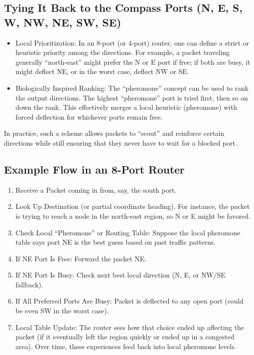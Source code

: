 \documentclass[../OAE-SPEC-MAIN.tex]{subfiles}
\begin{document}
\subsection{Tying It Back to the Compass Ports (N, E, S, W, NW, NE, SW, SE)}
%
\begin{itemize}
\item Local Prioritization: In an 8-port (or 4-port) router, one can define a strict or heuristic priority among the directions. For example, a packet traveling generally “north-east” might prefer the N or E port if free; if both are busy, it might deflect NE, or in the worst case, deflect NW or SE.
\item Biologically Inspired Ranking: The “pheromone” concept can be used to rank the output directions. The highest “pheromone” port is tried first, then so on down the rank. This effectively merges a local heuristic (pheromone) with forced deflection for whichever ports remain free.
\end{itemize}

In practice, such a scheme allows packets to “scout” and reinforce certain directions while still ensuring that they never have to wait for a blocked port.

\subsection{Example Flow in an 8-Port Router}

\begin{enumerate}
\item		Receive a Packet coming in from, say, the south port.
\item		Look Up Destination (or partial coordinate heading). For instance, the packet is trying to reach a node in the north-east region, so N or E might be favored.
\item		Check Local “Pheromone” or Routing Table: Suppose the local pheromone table says port NE is the best guess based on past traffic patterns.
\item		If NE Port Is Free: Forward the packet NE.
\item		If NE Port Is Busy: Check next best local direction (N, E, or NW/SE fallback).
\item		If All Preferred Ports Are Busy: Packet is deflected to any open port (could be even SW in the worst case).
\item		Local Table Update: The router sees how that choice ended up affecting the packet (if it eventually left the region quickly or ended up in a congested area). Over time, these experiences feed back into local pheromone levels.
\end{enumerate}
\end{document}
